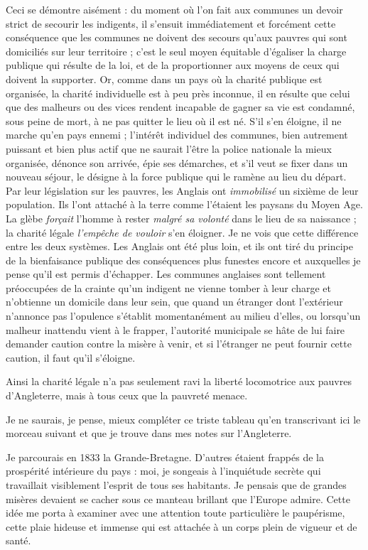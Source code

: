 \documentclass[french,twoside]{book} %
\begin{document}
\noindent Ceci se démontre aisément : du moment où l’on fait aux communes un devoir strict de secourir les indigents, il s’ensuit immédiatement et forcément cette conséquence que les communes ne doivent des secours qu’aux pauvres qui sont domiciliés sur leur territoire ; c’est le seul moyen équitable d’égaliser la charge publique qui résulte de la loi, et de la proportionner aux moyens de ceux qui doivent la supporter. Or, comme dans un pays où la charité publique est organisée, la charité individuelle est à peu près inconnue, il en résulte que celui que des malheurs ou des vices rendent incapable de gagner sa vie est condamné, sous peine de mort, à ne pas quitter le lieu où il est né. S'il s’en éloigne, il ne marche qu’en pays ennemi ; l’intérêt individuel des communes, bien autrement puissant et bien plus actif que ne saurait l’être la police nationale la mieux organisée, dénonce son arrivée, épie ses démarches, et s’il veut se fixer dans un nouveau séjour, le désigne à la force publique qui le ramène au lieu du départ. Par leur législation sur les pauvres, les Anglais ont \emph{immobilisé} un sixième de leur population. Ils l’ont attaché à la terre comme l’étaient les paysans du Moyen Age. La glèbe \emph{forçait} l’homme à rester \emph{malgré sa volonté} dans le lieu de sa naissance ; la charité légale \emph{l’empêche de vouloir} s’en éloigner. Je ne vois que cette différence entre les deux systèmes. Les Anglais ont été plus loin, et ils ont tiré du principe de la bienfaisance publique des conséquences plus funestes encore et auxquelles je pense qu’il est permis d’échapper. Les communes anglaises sont tellement préoccupées de la crainte qu’un indigent ne vienne tomber à leur charge et n’obtienne un domicile dans leur sein, que quand un étranger dont l’extérieur n’annonce pas l’opulence s’établit momentanément au milieu d’elles, ou lorsqu’un malheur inattendu vient à le frapper, l’autorité municipale se hâte de lui faire demander caution contre la misère à venir, et si l’étranger ne peut fournir cette caution, il faut qu’il s’éloigne.\par
Ainsi la charité légale n’a pas seulement ravi la liberté locomotrice aux pauvres d’Angleterre, mais à tous ceux que la pauvreté menace.\par
\bigbreak
\noindent Je ne saurais, je pense, mieux compléter ce triste tableau qu’en transcrivant ici le morceau suivant et que je trouve dans mes notes sur l’Angleterre.\par
Je parcourais en 1833 la Grande-Bretagne. D'autres étaient frappés de la prospérité intérieure du pays : moi, je songeais à l’inquiétude secrète qui travaillait visiblement l’esprit de tous ses habitants. Je pensais que de grandes misères devaient se cacher sous ce manteau brillant que l’Europe admire. Cette idée me porta à examiner avec une attention toute particulière le paupérisme, cette plaie hideuse et immense qui est attachée à un corps plein de vigueur et de santé.\par
\end{document}
